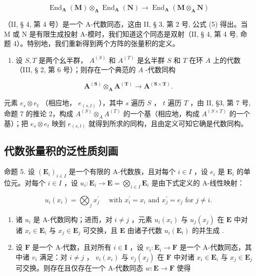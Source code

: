 \[
\operatorname{End} _ {\mathbf {A}} (\mathbf {M}) \otimes_ {\mathbf {A}} \operatorname{End} _ {\mathbf {A}} (\mathbf {N}) \rightarrow \operatorname{End} _ {\mathbf {A}} (\mathbf {M} \otimes_ {\mathbf {A}} \mathbf {N})\tag{2}
\]

（II, § 4, 第 4 号）是一个 A-代数同态，这由 II, § 3, 第 2 号, 公式 (5) 得出。当 M 或 N 是有限生成投射 A-模时，我们知道这个同态是双射（II, § 4, 第 4 号, 命题 4）。特别地，我们重新得到两个方阵的张量积的定义。

\begin{enumerate}
\def\labelenumi{(\arabic{enumi})}
\setcounter{enumi}{1}
\tightlist
\item
  设 \(S, T\) 是两个幺半群， \(A^{(S)}\) 和 \(A^{(T)}\) 是幺半群 \(S\) 和 \(T\) 在环 \(A\) 上的代数（III, § 2, 第 6 号）；则存在一个典范的 \(A\) -代数同构
\end{enumerate}

\[
\mathbf {A} ^ {(\mathbf {S})} \otimes_ {\mathbf {A}} \mathbf {A} ^ {(\mathbf {T})} \rightarrow \mathbf {A} ^ {(\mathbf {S} \times \mathbf {T})}.\tag{3}
\]

元素 \(e_s \otimes e_t\) （相应地， \(e_{(s,t)}\) ），其中 \(s\) 遍历 \(S\) ， \(t\) 遍历 \(T\) ，由 II, §3, 第 7 号, 命题 7 的推论 2，构成 \(A^{(S)} \otimes_A A^{(T)}\) 的一个基（相应地，构成 \(A^{(S \times T)}\) 的一个基）；把 \(e_s \otimes e_t\) 映到 \(e_{(s,t)}\) 就得到所求的同构，且由定义可知它确是代数同构。

\subsection{代数张量积的泛性质刻画}

命题 5. 设 \((\mathbf{E}_i)_{i\in I}\) 是一个有限的 A-代数族，且对每个 \(i\in I\) ，设 \(e_i\) 是 \(\mathbf{E}_i\) 的单位元。对每个 \(i\in I\) ，设 \(u_i: \mathbf{E}_i \to \mathbf{E} = \bigotimes_{i\in I} \mathbf{E}_i\) 是由下式定义的 A-线性映射：

\[
u _ {i} (x _ {i}) = \bigotimes_ {j} x _ {j} ^ {\prime} \quad \text { with } x _ {i} ^ {\prime} = x _ {i} \text { and } x _ {j} ^ {\prime} = e _ {j} \text { for } j \neq i.
\]

\begin{enumerate}
\def\labelenumi{(\roman{enumi})}
\item
  诸 \(u_{i}\) 是 A-代数同构；进而，对 \(i \neq j\) ，元素 \(u_{i}(x_{i})\) 与 \(u_{j}(x_{j})\) 在 \(\mathbf{E}\) 中对诸 \(x_{i} \in \mathbf{E}_{i}\) 与 \(x_{j} \in \mathbf{E}_{j}\) 可交换，且 \(\mathbf{E}\) 由诸子代数 \(u_{i}(\mathbf{E}_{i})\) 的并生成 .
\item
  设 \(\mathbf{F}\) 是一个 A-代数，且对所有 \(i \in \mathbf{I}\) ，设 \(v_i: \mathbf{E}_i \to \mathbf{F}\) 是一个 A-代数同态，其中诸 \(v_i\) 满足：对 \(i \neq j\) ， \(v_i(x_i)\) 与 \(v_j(x_j)\) 在 \(\mathbf{F}\) 中对诸 \(x_i \in \mathbf{E}_i\) 与 \(x_j \in \mathbf{E}_j\) 可交换。则存在且仅存在一个 A-代数同态 \(w: \mathbf{E} \to \mathbf{F}\) 使得
\end{enumerate}

